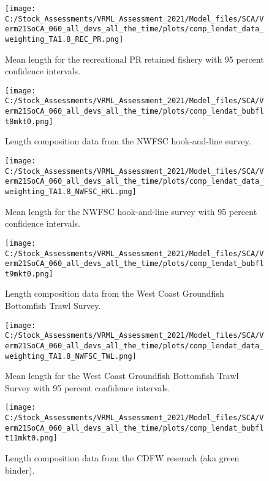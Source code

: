 \documentclass[11pt,
  english,
  a4paper,
]{article}
\begin{document}
\begin{figure}
\centering
\texttt{[image: C:/Stock\_Assessments/VRML\_Assessment\_2021/Model\_files/SCA/Verm21SoCA\_060\_all\_devs\_all\_the\_time/plots/comp\_lendat\_data\_weighting\_TA1.8\_REC\_PR.png]}
\caption{Mean length for the recreational PR retained fishery with 95 percent confidence intervals.\label{fig:mean-com-len-data-REC-PR}}
\end{figure}

\begin{figure}
\centering
\texttt{[image: C:/Stock\_Assessments/VRML\_Assessment\_2021/Model\_files/SCA/Verm21SoCA\_060\_all\_devs\_all\_the\_time/plots/comp\_lendat\_bubflt8mkt0.png]}
\caption{Length composition data from the NWFSC hook-and-line survey.\label{fig:len-data-NWFSC-HKL}}
\end{figure}

\begin{figure}
\centering
\texttt{[image: C:/Stock\_Assessments/VRML\_Assessment\_2021/Model\_files/SCA/Verm21SoCA\_060\_all\_devs\_all\_the\_time/plots/comp\_lendat\_data\_weighting\_TA1.8\_NWFSC\_HKL.png]}
\caption{Mean length for the NWFSC hook-and-line survey with 95 percent confidence intervals.\label{fig:mean-com-len-data-NWFSC-HKL}}
\end{figure}

\begin{figure}
\centering
\texttt{[image: C:/Stock\_Assessments/VRML\_Assessment\_2021/Model\_files/SCA/Verm21SoCA\_060\_all\_devs\_all\_the\_time/plots/comp\_lendat\_bubflt9mkt0.png]}
\caption{Length composition data from the West Coast Groundfish Bottomfish Trawl Survey.\label{fig:len-data-NWFSC-TWL}}
\end{figure}

\begin{figure}
\centering
\texttt{[image: C:/Stock\_Assessments/VRML\_Assessment\_2021/Model\_files/SCA/Verm21SoCA\_060\_all\_devs\_all\_the\_time/plots/comp\_lendat\_data\_weighting\_TA1.8\_NWFSC\_TWL.png]}
\caption{Mean length for the West Coast Groundfish Bottomfish Trawl Survey with 95 percent confidence intervals.\label{fig:mean-com-len-data-NWFSC-TWL}}
\end{figure}

\begin{figure}
\centering
\texttt{[image: C:/Stock\_Assessments/VRML\_Assessment\_2021/Model\_files/SCA/Verm21SoCA\_060\_all\_devs\_all\_the\_time/plots/comp\_lendat\_bubflt11mkt0.png]}
\caption{Length composition data from the CDFW reserach (aka green binder).\label{fig:len-data-CDFW-RESEARCH}}
\end{figure}
\end{document}
